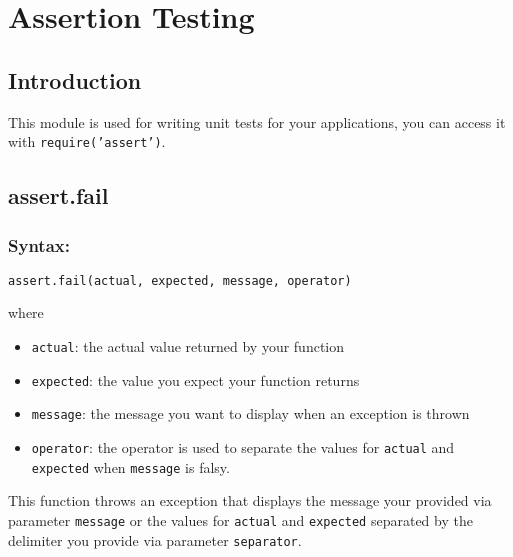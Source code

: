 
\chapter{Assertion Testing}

\section{Introduction}
This module is used for writing unit tests for your applications, you can access it with \texttt{require('assert')}.\section{assert.fail}
\subsection*{Syntax:}
\begin{center}\texttt{assert.fail(actual, expected, message, operator)}

\end{center}where
\begin{itemize}
\item \texttt{actual}: the actual value returned by your function
\item \texttt{expected}: the value you expect your function returns
\item \texttt{message}: the message you want to display when an exception is thrown
\item \texttt{operator}: the operator is used to separate the values for \texttt{actual} and \texttt{expected} when \texttt{message} is falsy.
\end{itemize}
This function throws an exception that displays the message your provided via parameter \texttt{message} or the values for \texttt{actual} and \texttt{expected} separated by the delimiter you provide via parameter \texttt{separator}.

